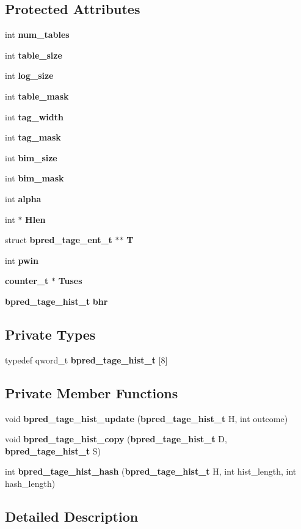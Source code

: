 \subsection*{Protected Attributes}
\begin{CompactItemize}
\item 
int {\bf num\_\-tables}
\item 
int {\bf table\_\-size}
\item 
int {\bf log\_\-size}
\item 
int {\bf table\_\-mask}
\item 
int {\bf tag\_\-width}
\item 
int {\bf tag\_\-mask}
\item 
int {\bf bim\_\-size}
\item 
int {\bf bim\_\-mask}
\item 
int {\bf alpha}
\item 
int $\ast$ {\bf Hlen}
\item 
struct {\bf bpred\_\-tage\_\-ent\_\-t} $\ast$$\ast$ {\bf T}
\item 
int {\bf pwin}
\item 
{\bf counter\_\-t} $\ast$ {\bf Tuses}
\item 
{\bf bpred\_\-tage\_\-hist\_\-t} {\bf bhr}
\end{CompactItemize}
\subsection*{Private Types}
\begin{CompactItemize}
\item 
typedef qword\_\-t {\bf bpred\_\-tage\_\-hist\_\-t} [8]
\end{CompactItemize}
\subsection*{Private Member Functions}
\begin{CompactItemize}
\item 
void {\bf bpred\_\-tage\_\-hist\_\-update} ({\bf bpred\_\-tage\_\-hist\_\-t} H, int outcome)
\item 
void {\bf bpred\_\-tage\_\-hist\_\-copy} ({\bf bpred\_\-tage\_\-hist\_\-t} D, {\bf bpred\_\-tage\_\-hist\_\-t} S)
\item 
int {\bf bpred\_\-tage\_\-hist\_\-hash} ({\bf bpred\_\-tage\_\-hist\_\-t} H, int hist\_\-length, int hash\_\-length)
\end{CompactItemize}


\subsection{Detailed Description}


